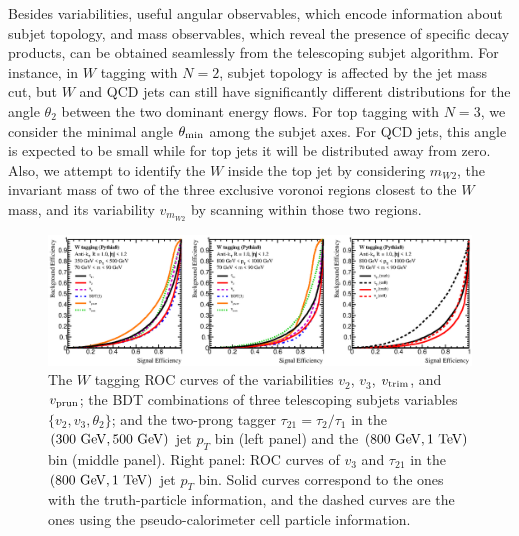 \documentclass[aps,prl,floatfix,preprintnumbers,twocolumn,groupedaddress,nofootinbib]{revtex4-1}
\begin{document}
Besides variabilities, useful angular observables, which encode information about subjet topology, and mass observables, which reveal the presence of specific decay products, can be obtained seamlessly from the telescoping subjet algorithm. For instance, in $W$ tagging with $N=2$, subjet topology is affected by the jet mass cut, but $W$ and QCD jets can still have significantly different distributions for the angle $\theta_2$ between the two dominant energy flows. For top tagging with $N=3$, we consider the minimal angle $\theta_{\rm min}$ among the subjet axes. For QCD jets, this angle is expected to be small while for top jets it will be distributed away from zero. Also, we attempt to identify the $W$ inside the top jet \cite{Thaler:2008ju,Kaplan:2008ie} by considering \textbf{$m_{W2}$}, the invariant mass of two of the three exclusive voronoi regions closest to the $W$ mass, and its variability $v_{m_{W2}}$ by scanning within those two regions.

\begin{figure}
    \includegraphics[width=2\columnwidth]{plots/W_ROCs_5.eps}
    \caption{The $W$ tagging ROC curves of the variabilities $v_2$, $v_3$, $v_{\rm trim}$, and $v_{\rm prun}$;
    the BDT combinations of three telescoping subjets variables $\{v_2, v_3, \theta_2\}$; and the two-prong tagger $\tau_{21}=\tau_{2}/\tau_{1}$ in the $(300~{\rm GeV}, 500~{\rm GeV})$ jet $p_T$ bin (left panel) and the $(800~{\rm GeV}, 1~{\rm TeV})$ bin (middle panel). Right panel: ROC curves of $v_3$ and $\tau_{21}$ in the $(800~{\rm GeV}, 1~{\rm TeV})$ jet $p_T$ bin. Solid curves correspond to the ones with the truth-particle information, and the dashed curves are the ones using the pseudo-calorimeter cell particle information.}
\label{ROC_W}
\end{figure}
\end{document}
